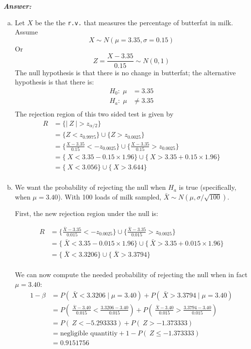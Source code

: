\documentclass[12pt]{article}
\begin{document}
  \textbf{\color{TealBlue}\emph{Answer:} } 
 \begin{enumerate}[(a)]  
\item Let $X$ be the the \texttt{r.v.} that measures the percentage of butterfat in milk. Assume 
$$
X \sim N(\mu = 3.35, \sigma = 0.15)
$$
Or
$$
Z = \frac{X - 3.35}{0.15} \sim N(0,1)
$$
The null hypothesis is that there is no change in butterfat; the alternative hypothesis is that there is:
\begin{align*}
H_0 : \; \mu &= 3.35 \\
H_a : \; \mu &\neq 3.35\\
\end{align*}
The rejection region of this two sided test is given by 
\begin{align*}
R &= \Big\{ |\ Z \ | > z_{\alpha / 2} \Big\}  \\
&= \Big\{ Z < z_{0.9975} \Big\} \cup \Big\{ Z >  z_{0.0025} \Big\} \\
&= \Big\{  \frac{X - 3.35}{0.15} < - z_{0.0025} \Big\}   \cup \Big\{  \frac{X - 3.35}{0.15} >  z_{0.0025} \Big\} \\
&= \Big\{  \ X < 3.35 - 0.15 \times 1.96 \Big\}  \cup \Big\{ \ X >  3.35 + 0.15 \times 1.96 \Big\} \\
&= \Big\{  \ X < 3.056  \Big\}  \cup \Big\{ \ X > 3.644 \Big\} \\
\end{align*}

\item We want the probability of rejecting the null when $H_a$ is true (specifically, when $\mu = 3.40$). With 100 loads of milk sampled, $\bar X \sim N(\mu, \sigma / \sqrt{ 100})$. 

First, the new rejection region under the null is:

\begin{align*}
R &= \Big\{  \frac{\bar X - 3.35}{0.015} < - z_{0.0025} \Big\}   \cup \Big\{  \frac{\bar X - 3.35}{0.015} >  z_{0.0025} \Big\} \\
&= \Big\{  \ \bar X < 3.35 - 0.015 \times 1.96 \Big\}  \cup \Big\{ \ \bar X >  3.35 + 0.015 \times 1.96 \Big\} \\
&= \Big\{  \ \bar X < 3.3206  \Big\}  \cup \Big\{ \ \bar X > 3.3794 \Big\} \\
\end{align*}

We can now compute the needed probability of rejecting the null when in fact $\mu = 3.40$:
\begin{align*}
1 - \beta &= P ( \ \bar X < 3.3206 \mid \mu = 3.40 ) + P ( \ \bar X > 3.3794 \mid \mu = 3.40 ) \\
&= P \left( \ \frac{\bar X - 3.40}{0.015} < \frac{3.3206 - 3.40}{0.015} \right) + P \left( \ \frac{\bar X - 3.40}{0.015} > \frac{3.3794 - 3.40}{0.015} \right)  \\
&= P \left( \ Z <  -5.293333 \right) + P \left( \ Z >  -1.373333 \right) \\
&= \text{negligible quantitiy} + 1 - P \left( \ Z \leq  -1.373333 \right) \\
&= 0.9151756
\end{align*}



\end{enumerate}
\end{document}
